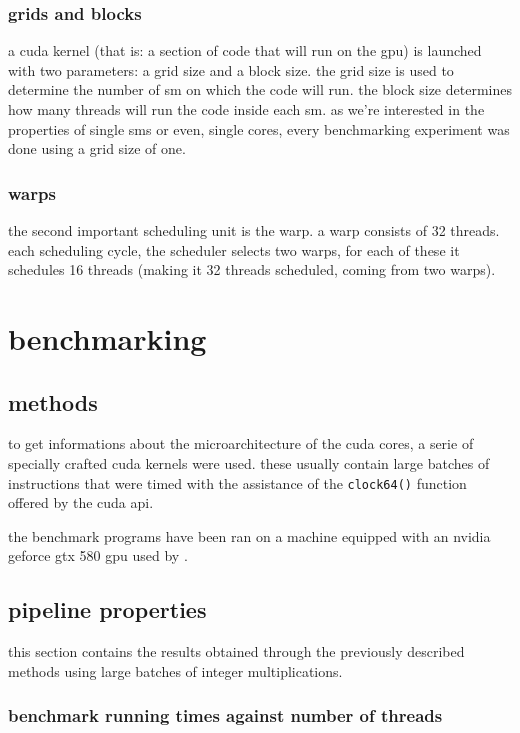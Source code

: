 \documentclass{report}
\begin{document}
        \subsection{grids and blocks} 
        a cuda kernel (that is: a section of code that will run on the gpu) is
        launched with two parameters: a grid size and a block size. the grid 
        size is used to determine the number of sm on which the code will run.
        the block size determines how many threads will run the code inside each
        sm\cite{cudaprog}. as we're interested in the properties of single sms or even, single
        cores, every benchmarking experiment was done using a grid size of one.

        \subsection{warps}
        the second important scheduling unit is the warp. a warp consists
        of 32 threads. each scheduling cycle, the scheduler selects two
        warps, for each of these it schedules 16 threads (making it 32
        threads scheduled, coming from two warps)\cite{cudaprog}.

\chapter{benchmarking}

\section{methods}
	to get informations about the microarchitecture of the cuda cores, a serie 
    of specially crafted cuda kernels were used. these usually contain large 
    batches of instructions that were timed with the assistance of the \texttt{clock64()} 
    function offered by the cuda api.

	the benchmark programs have been ran on a machine equipped with an nvidia
    geforce gtx 580 gpu used by \cite{cofact14}.

\section{pipeline properties}
	this section contains the results obtained through the previously described
	methods using large batches of integer multiplications.

	\subsection{benchmark running times against number of threads}
	\label{par:pipeline_exp}
\end{document}

